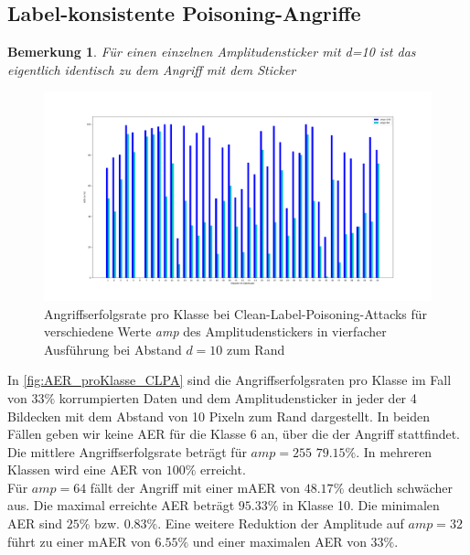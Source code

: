 \documentclass[11pt,a4paper]{article}
\newtheorem{remark}[theorem]{Bemerkung}
\numberwithin{equation}{section}
\begin{document}
	\subsection{Label-konsistente Poisoning-Angriffe}

	
	\begin{remark}
		Für einen einzelnen Amplitudensticker mit d=10 ist das eigentlich identisch zu dem Angriff mit dem Sticker
	\end{remark}

	
	\begin{figure}[h]
		\begin{center}
			\includegraphics[width=0.5\textheight]{Vergleich_AER_CLPA.png}
			\caption{Angriffserfolgsrate pro Klasse bei Clean-Label-Poisoning-Attacks für verschiedene Werte \textit{amp} des Amplitudenstickers in vierfacher Ausführung bei Abstand $d=10$ zum Rand}
			\label{fig:AER_proKlasse_CLPA}
		\end{center}
	\end{figure}
	
	In \autoref{fig:AER_proKlasse_CLPA} sind die Angriffserfolgsraten pro Klasse im Fall von $33 \%$ korrumpierten Daten und dem Amplitudensticker in jeder der 4 Bildecken mit dem Abstand von 10 Pixeln zum Rand dargestellt. In beiden Fällen geben wir keine AER für die Klasse 6 an, über die der Angriff stattfindet.
	Die mittlere Angriffserfolgsrate beträgt für $amp=255$ $79.15 \%$. In mehreren Klassen wird eine AER von $100 \%$ erreicht.\\
	Für $amp=64$ fällt der Angriff mit einer mAER von $48.17 \%$ deutlich schwächer aus. Die maximal erreichte AER beträgt $95.33 \%$ in Klasse 10. Die minimalen AER sind $25 \%$ bzw. $0.83 \% $.
	Eine weitere Reduktion der Amplitude auf $amp=32$ führt zu einer mAER von $6.55 \%$ und einer maximalen AER von $33 \%$.
	
\end{document}
